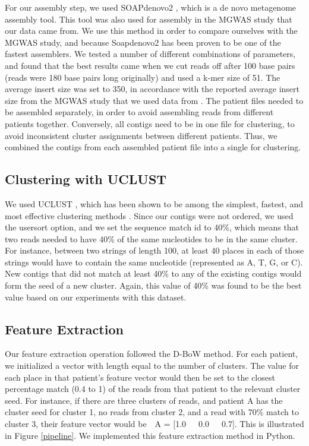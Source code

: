 For our assembly step, we used SOAPdenovo2 \cite{luo12}, which is a de novo metagenome assembly tool. This tool was also used for assembly in the MGWAS study that our data came from. We use this method in order to compare ourselves with the MGWAS study, and because Soapdenovo2 has been proven to be one of the fastest assemblers\cite{peng12}. We tested a number of different combinations of parameters, and found that the best results came when we cut reads off after 100 base pairs (reads were 180 base pairs long originally) and used a k-mer size of 51. The average insert size was set to 350, in accordance with the reported average insert size from the MGWAS study that we used data from \cite{qin041012}. The patient files needed to be assembled separately, in order to avoid assembling reads from different patients together. Conversely, all contigs need to be in one file for clustering, to avoid inconsistent cluster assignments between different patients. Thus, we combined the contigs from each assembled patient file into a single for clustering.

\subsection{Clustering with UCLUST}

We used UCLUST \cite{Edgar10}, which has been shown to be among the simplest, fastest, and most effective clustering methods \cite{bonder090112, sun042711}. Since our contigs were not ordered, we used the usersort option, and we set the sequence match id to 40\%, which means that two reads needed to have 40\% of the same nucleotides to be in the same cluster. For instance, between two strings of length 100, at least 40 places in each of those strings would have to contain the same nucleotide (represented as A, T, G, or C). New contigs that did not match at least 40\% to any of the existing contigs would form the seed of a new cluster. Again, this value of 40\% was found to be the best value based on our experiments with this dataset.

\subsection{Feature Extraction}

Our feature extraction operation followed the D-BoW method. For each patient, we initialized a vector with length equal to the number of clusters. The value for each place in that patient's feature vector would then be set to the closest percentage match (0.4 to 1) of the reads from that patient to the relevant cluster seed. For instance, if there are three clusters of reads, and patient A has the cluster seed for cluster 1, no reads from cluster 2, and a read with 70\% match to cluster 3, their feature vector would be~~A = [1.0~~~0.0~~~0.7]. This is illustrated in Figure \ref{pipeline}. We implemented this feature extraction method in Python.


